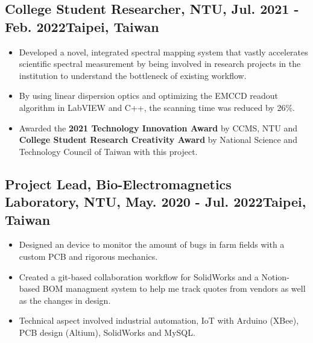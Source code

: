 \documentclass[12pt]{article}
\begin{document}
        \subsection*{College Student Researcher, NTU, Jul. 2021 - Feb. 2022\hfill Taipei, Taiwan}
        { \small
        \begin{itemize}
            \item Developed a novel, integrated spectral mapping system that vastly accelerates scientific spectral measurement by being involved in research projects in the institution to understand the bottleneck of existing workflow.
            \item By using linear dispersion optics and optimizing the EMCCD readout algorithm in LabVIEW and C++, the scanning time was reduced by 26\%.
            \item Awarded the \textbf{2021 Technology Innovation Award} by CCMS, NTU and \textbf{College Student Research Creativity Award} by National Science and Technology Council of Taiwan with this project.
        \end{itemize}}
        \subsection*{Project Lead, Bio-Electromagnetics Laboratory, NTU, May. 2020 - Jul. 2022\hfill Taipei, Taiwan}
        { \small
        \begin{itemize}
            \item Designed an device to monitor the amount of bugs in farm fields with a custom PCB and rigorous mechanics.
            \item Created a git-based collaboration workflow for SolidWorks and a Notion-based BOM managment system to help me track quotes from vendors as well as the changes in design.
            \item Technical aspect involved industrial automation, IoT with Arduino (XBee), PCB design (Altium), SolidWorks and MySQL.
        \end{itemize}
        }
        
        
\end{document}
